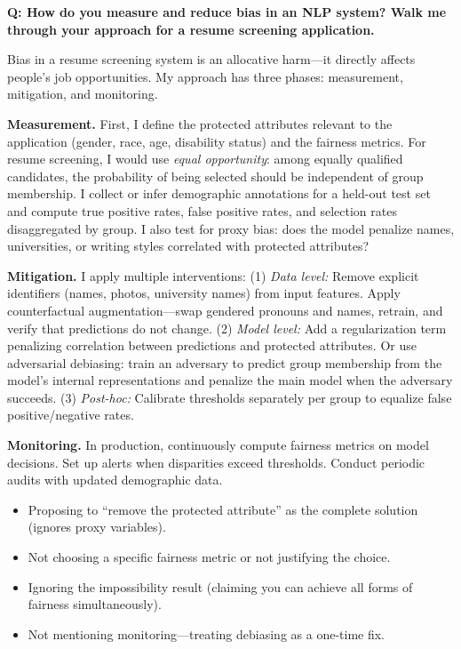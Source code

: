\begin{interviewq}
\textbf{Q: How do you measure and reduce bias in an NLP system? Walk me through
your approach for a resume screening application.}

 \quad {} \quad \badgefreq{\freqhigh}

\stronganswer
Bias in a resume screening system is an allocative harm---it directly affects
people's job opportunities.  My approach has three phases: measurement,
mitigation, and monitoring.

\textbf{Measurement.}  First, I define the protected attributes relevant to the
application (gender, race, age, disability status) and the fairness metrics.
For resume screening, I would use \emph{equal opportunity}: among equally
qualified candidates, the probability of being selected should be independent
of group membership.  I collect or infer demographic annotations for a held-out
test set and compute true positive rates, false positive rates, and selection
rates disaggregated by group.  I also test for proxy bias: does the model
penalize names, universities, or writing styles correlated with protected
attributes?

\textbf{Mitigation.}  I apply multiple interventions: (1) \emph{Data level:}
Remove explicit identifiers (names, photos, university names) from input
features.  Apply counterfactual augmentation---swap gendered pronouns and names,
retrain, and verify that predictions do not change.  (2) \emph{Model level:}
Add a regularization term penalizing correlation between predictions and
protected attributes.  Or use adversarial debiasing: train an adversary to
predict group membership from the model's internal representations and penalize
the main model when the adversary succeeds.  (3) \emph{Post-hoc:} Calibrate
thresholds separately per group to equalize false positive/negative rates.

\textbf{Monitoring.}  In production, continuously compute fairness metrics on
model decisions.  Set up alerts when disparities exceed thresholds.  Conduct
periodic audits with updated demographic data.

\redflags
\begin{itemize}
    \item Proposing to ``remove the protected attribute'' as the complete
    solution (ignores proxy variables).
    \item Not choosing a specific fairness metric or not justifying the choice.
    \item Ignoring the impossibility result (claiming you can achieve all forms
    of fairness simultaneously).
    \item Not mentioning monitoring---treating debiasing as a one-time fix.
\end{itemize}


\end{interviewq}
